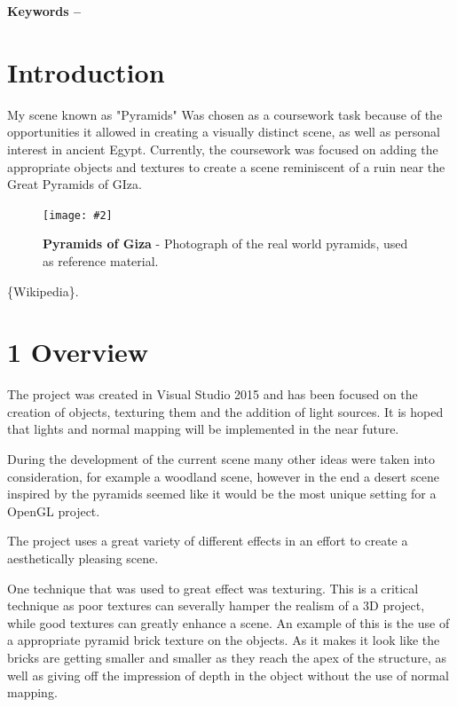 \documentclass[10pt, a4paper]{article}
\title{\mytitle}
\author{\myauthor\hspace{1em}\\\contact\\Edinburgh Napier University\hspace{0.5em}-\hspace{0.5em}\mymodule}
\date{}
\newcommand{\figuremacro}[5]{
    \begin{figure}[#1]
        \centering
        \texttt{[image: \#2]}
        \caption[#3]{\textbf{#3}#4}
        \label{fig:#2}
    \end{figure}
}
\begin{document}
	\maketitle
	\begin{abstract}
		The purpose of was to develop a 3D scene that demonstrate understanding of these features. At a minimum, textures and lighting will be implemented to add an element of realism.
		
		
	\end{abstract}
    
	\textbf{Keywords -- }{\mykeywords}
	\section{Introduction}
	My scene known as "Pyramids" Was chosen as a coursework task because of the opportunities it allowed in creating a visually distinct scene, as well as personal interest in ancient Egypt. Currently, the coursework was focused on adding the appropriate objects and textures to create a scene reminiscent of a ruin near the Great Pyramids of GIza.
	
	 \figuremacro{h}{pyramids}{Pyramids of Giza}{ - Photograph of the real world pyramids, used as reference material.}{1.0}
	\{Wikipedia\}.
	
    \section{1 Overview}
    The project was created in Visual Studio 2015 and has been focused on the creation of objects, texturing them and the addition of light sources. 
    It is hoped that lights and normal mapping will be implemented in the near future.
    
    During the development of the current scene many other ideas were taken into consideration, for example a woodland scene, however in the end a desert scene inspired by the pyramids seemed like it would be the most unique setting for a OpenGL project.
    
    The project uses a great variety of different effects in an effort to create a aesthetically pleasing scene. 
    
    One technique that was used to great effect was texturing. This is a critical technique as poor textures can severally hamper the realism of a 3D project, while good textures can greatly enhance a scene. An example of this is the use of a appropriate pyramid brick texture on the objects. As it makes it look like the bricks are getting smaller and smaller as they reach the apex of the structure, as well as giving off the impression of depth in the object without the use of normal mapping.
    
\end{document}
